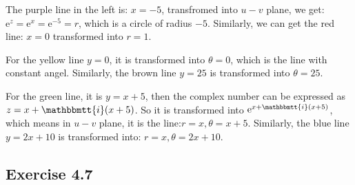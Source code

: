 \documentclass[]{ctexart}
\newcommand{\mi}{\mathbbmtt{i}}
\newcommand{\me}{\mathrm{e}}
\begin{document}
		The purple line in the left is: $x=-5$, transfromed into $u-v$ plane, we get: $\me ^z=\me ^x=\me^{-5}=r$, which is a circle of radius $-5$. Similarly, we can get the red line: $x=0$ transformed into $r=1$.
		
		For the yellow line $y=0$, it is transformed into $\theta=0$, which is the line with constant angel. Similarly, the brown line $y=25$ is transformed into $\theta=25$.
		
		For the green line, it is $y=x+5$, then the complex number can be expressed as $z=x+\mi (x+5)$. So it is transformed into $\me ^{x+\mi (x+5)}$, which means in $u-v$ plane, it is the line:$r=x,\theta=x+5$. Similarly, the blue line $y=2x+10$ is transformed into: $r=x,\theta=2x+10$.
		
	\subsection{Exercise 4.7}
\end{document}
